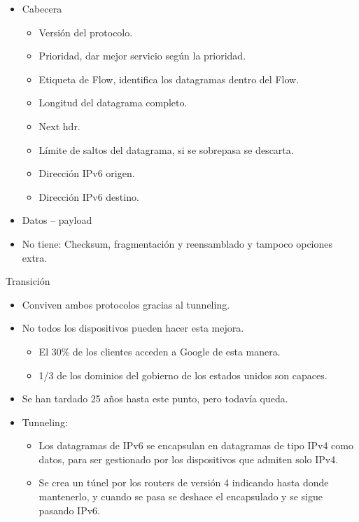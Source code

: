 \documentclass[12pt, twoside, openright]{report} %
\begin{document}
\begin{itemize}
	\item Cabecera

	      \begin{itemize}
		      \item Versión del protocolo.
		      \item Prioridad, dar mejor servicio según la prioridad.
		      \item Etiqueta de Flow, identifica los datagramas dentro del Flow.
		      \item Longitud del datagrama completo.
		      \item Next hdr.
		      \item Límite de saltos del datagrama, si se sobrepasa se descarta.
		      \item Dirección IPv6 origen.
		      \item Dirección IPv6 destino.
	      \end{itemize}
	\item Datos -- payload
	\item No tiene: Checksum, fragmentación y reensamblado y tampoco opciones
	      extra.
\end{itemize}

Transición

\begin{itemize}
	\item Conviven ambos protocolos gracias al tunneling.
	\item No todos los dispositivos pueden hacer esta mejora.

	      \begin{itemize}
		      \item El 30\% de los clientes acceden a Google de esta manera.
		      \item 1/3 de los dominios del gobierno de los estados unidos son
		            capaces.
	      \end{itemize}
	\item Se han tardado 25 años hasta este punto, pero todavía queda.
	\item Tunneling:
	      \begin{itemize}
		      \item Los datagramas de IPv6 se encapsulan en datagramas de tipo IPv4
		            como datos, para ser gestionado por los dispositivos que admiten
		            solo IPv4.
		      \item Se crea un túnel por los routers de versión 4 indicando hasta
		            donde mantenerlo, y cuando se pasa se deshace el encapsulado y se
		            sigue pasando IPv6.
	      \end{itemize}
\end{itemize}
\end{document}

